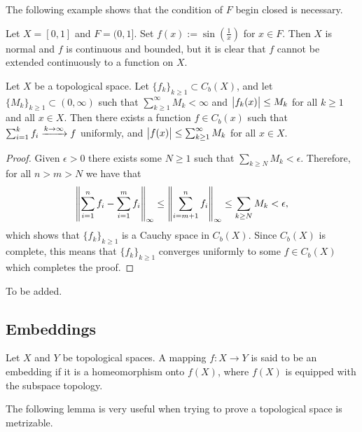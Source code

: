 \documentclass[11pt,a4paper]{article}
\begin{document}
The following example shows that the condition of $F$ begin closed is
necessary.

\begin{example}
  Let $X = [0,1]$ and $F = (0,1]$.
  Set $f(x) := \sin\left(\frac {1}{x}\right)$ for $x \in F$.
  Then $X$ is normal and $f$ is continuous and bounded, but it is clear
  that $f$ cannot be extended continuously to a function on $X$.
\end{example}

\begin{lemma}\label{lem:m-test}
  Let $X$ be a topological space. Let $\{f_k\}_{k \geq 1} \subset C_b(X)$,
  and let $\{M_k\}_{k \geq 1} \subset (0,\infty)$ such that
  $\sum_{k \geq 1}^{\infty} M_k < \infty$ and
  $\left\lvert f_k(x)\right\rvert \le M_k$ for all $k \geq 1$ and all $x \in X$.
  Then there exists a function $f \in C_b(x)$ such that
  $\sum_{i=1}^{k} f_i \xrightarrow{k \to \infty} f$ uniformly, and
  $\left\lvert f(x)\right\rvert \le \sum_{k \geq 1}^{\infty} M_k$ for all $x \in X$.
\end{lemma}
\begin{proof}
  Given $\epsilon > 0$ there exists some $N \geq 1$ such that
  $\sum_{k \geq N} M_k < \epsilon$. Therefore, for all $n > m > N$
  we have that
  \[
    \left\lVert\sum_{i=1}^{n} f_i - \sum_{i=1}^{m} f_i\right\rVert_{\infty} \le
    \left\lVert\sum_{i=m+1}^{n} f_i\right\rVert_{\infty} \le
    \sum_{k \geq N} M_k <
    \epsilon,
  \]
  which shows that $\{f_k\}_{k \geq 1}$ is a Cauchy space in $C_b(X)$.
  Since $C_b(X)$ is complete, this means that $\{f_k\}_{k \geq 1}$ converges
  uniformly to some $f \in C_b(X)$ which completes the proof.
\end{proof}

\begin{proofof}{}
  To be added.
\end{proofof}

\subsection{Embeddings}

\begin{definition}[Embedding]
    Let $X$ and $Y$ be topological spaces. A mapping $f \colon X \to Y$
    is said to be an embedding if it is a homeomorphism onto $f(X)$,
    where $f(X)$ is equipped with the subspace topology.
\end{definition}

The following lemma is very useful when trying to prove a topological space
is metrizable.
\end{document}
